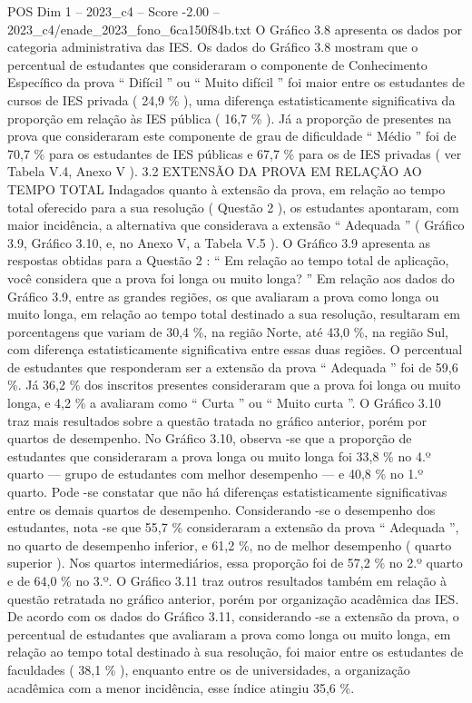 \begin{textsample}{POS Dim 1 – 2023\_c4 – Score -2.00 – 2023\_c4/enade\_2023\_fono\_6ca150f84b.txt}
O Gráfico 3.8 apresenta os dados por categoria administrativa das IES.
Os dados do Gráfico 3.8 mostram que o percentual de estudantes que consideraram o componente de Conhecimento Específico da prova “ Difícil ” ou “ Muito difícil ” foi maior entre os estudantes de cursos de IES privada ( 24,9 \% ), uma diferença estatisticamente significativa da proporção em relação às IES pública ( 16,7 \% ).
Já a proporção de presentes na prova que consideraram este componente de grau de dificuldade “ Médio ” foi de 70,7 \% para os estudantes de IES públicas e 67,7 \% para os de IES privadas ( ver Tabela V.4, Anexo V ). 3.2 EXTENSÃO DA PROVA EM RELAÇÃO AO TEMPO TOTAL Indagados quanto à extensão da prova, em relação ao tempo total oferecido para a sua resolução ( Questão 2 ), os estudantes apontaram, com maior incidência, a alternativa que considerava a extensão “ Adequada ” ( Gráfico 3.9, Gráfico 3.10, e, no Anexo V, a Tabela V.5 ).
O Gráfico 3.9 apresenta as respostas obtidas para a Questão 2 : “ Em relação ao tempo total de aplicação, você considera que a prova foi longa ou muito longa? ” Em relação aos dados do Gráfico 3.9, entre as grandes regiões, os que avaliaram a prova como longa ou muito longa, em relação ao tempo total destinado a sua resolução, resultaram em porcentagens que variam de 30,4 \%, na região Norte, até 43,0 \%, na região Sul, com diferença estatisticamente significativa entre essas duas regiões.
O percentual de estudantes que responderam ser a extensão da prova “ Adequada ” foi de 59,6 \%.
Já 36,2 \% dos inscritos presentes consideraram que a prova foi longa ou muito longa, e 4,2 \% a avaliaram como “ Curta ” ou “ Muito curta ”.
O Gráfico 3.10 traz mais resultados sobre a questão tratada no gráfico anterior, porém por quartos de desempenho.
No Gráfico 3.10, observa -se que a proporção de estudantes que consideraram a prova longa ou muito longa foi 33,8 \% no 4.º quarto — grupo de estudantes com melhor desempenho — e 40,8 \% no 1.º quarto.
Pode -se constatar que não há diferenças estatisticamente significativas entre os demais quartos de desempenho.
Considerando -se o desempenho dos estudantes, nota -se que 55,7 \% consideraram a extensão da prova “ Adequada ”, no quarto de desempenho inferior, e 61,2 \%, no de melhor desempenho ( quarto superior ).
Nos quartos intermediários, essa proporção foi de 57,2 \% no 2.º quarto e de 64,0 \% no 3.º.
O Gráfico 3.11 traz outros resultados também em relação à questão retratada no gráfico anterior, porém por organização acadêmica das IES.
De acordo com os dados do Gráfico 3.11, considerando -se a extensão da prova, o percentual de estudantes que avaliaram a prova como longa ou muito longa, em relação ao tempo total destinado à sua resolução, foi maior entre os estudantes de faculdades ( 38,1 \% ), enquanto entre os de universidades, a organização acadêmica com a menor incidência, esse índice atingiu 35,6 \%.

\end{textsample}
